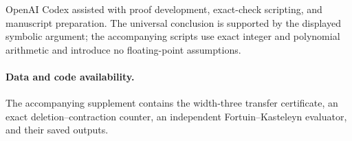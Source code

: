 \documentclass[11pt]{article}
\begin{document}
OpenAI Codex assisted with proof development, exact-check scripting, and
manuscript preparation.  The universal conclusion is supported by the
displayed symbolic argument; the accompanying scripts use exact integer and
polynomial arithmetic and introduce no floating-point assumptions.

\paragraph{Data and code availability.}
The accompanying supplement contains the width-three transfer certificate,
an exact deletion--contraction counter, an independent Fortuin--Kasteleyn
evaluator, and their saved outputs.



\end{document}
